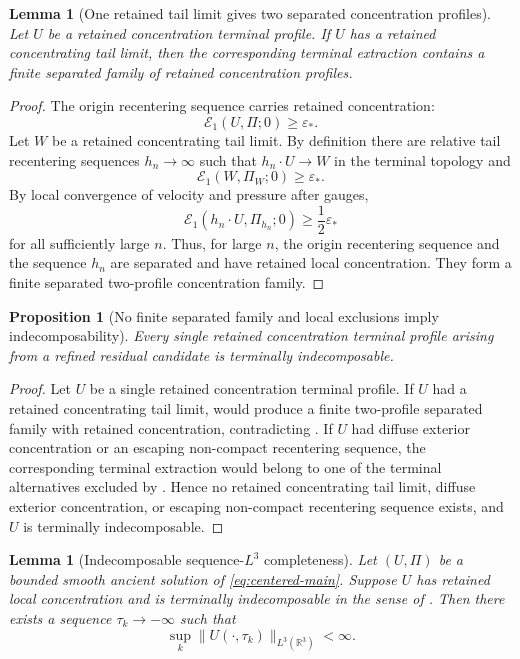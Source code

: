 \documentclass[11pt]{amsart}
\numberwithin{equation}{section}
\theoremstyle{plain}
\newtheorem{proposition}[theorem]{Proposition}
\newtheorem{lemma}[theorem]{Lemma}
\theoremstyle{definition}
\theoremstyle{remark}
\newcommand{\R}{\mathbb R}
\newcommand{\eps}{\varepsilon}
\newcommand{\calE}{\mathcal E}
\begin{document}
\begin{lemma}[One retained tail limit gives two separated concentration profiles]
\label{lem:descendant-to-separated-family}
Let \(U\) be a retained concentration terminal profile.  If \(U\) has a
retained concentrating tail limit, then the corresponding terminal extraction contains a
finite separated family of retained concentration profiles.
\end{lemma}

\begin{proof}
The origin recentering sequence carries retained concentration:
\[
   \calE_1(U,\Pi;0)\ge\eps_*.
\]
Let \(W\) be a retained concentrating tail limit.  By definition there are
relative tail recentering sequences \(h_n\to\infty\) such that \(h_n\cdot U\to W\) in the
terminal topology and
\[
   \calE_1(W,\Pi_W;0)\ge\eps_*.
\]
By local convergence of velocity and pressure after gauges,
\[
   \calE_1(h_n\cdot U,\Pi_{h_n};0)\ge\frac12\eps_*
\]
for all sufficiently large \(n\).  Thus, for large \(n\), the origin
recentering sequence and the sequence \(h_n\) are separated and have retained
local concentration.
They form a finite separated two-profile concentration family.
\end{proof}

\begin{proposition}[No finite separated family and local exclusions imply indecomposability]
\label{prop:no-multi-implies-atomic}
Every single retained concentration terminal profile arising from a refined
residual candidate is terminally indecomposable.
\end{proposition}

\begin{proof}
Let \(U\) be a single retained concentration terminal profile.  If \(U\) had a
retained concentrating tail limit,  would
produce a finite two-profile separated family with retained concentration, contradicting
.  If \(U\) had diffuse exterior
concentration or an escaping non-compact recentering sequence, the corresponding
terminal extraction would belong to one of the terminal alternatives excluded
by .  Hence no retained concentrating
tail limit, diffuse exterior concentration, or escaping non-compact recentering
sequence exists, and \(U\) is terminally indecomposable.
\end{proof}

\begin{lemma}[Indecomposable sequence-\(L^3\) completeness]
\label{lem:atomic-sequence-L3}
Let \((U,\Pi)\) be a bounded smooth ancient solution of
\eqref{eq:centered-main}.  Suppose \(U\) has retained local concentration and
is terminally indecomposable in the sense of
.  Then there exists a sequence
\(\tau_k\to-\infty\) such that
\[
   \sup_k\|U(\cdot,\tau_k)\|_{L^3(\R^3)}<\infty .
\]
\end{lemma}
\end{document}
